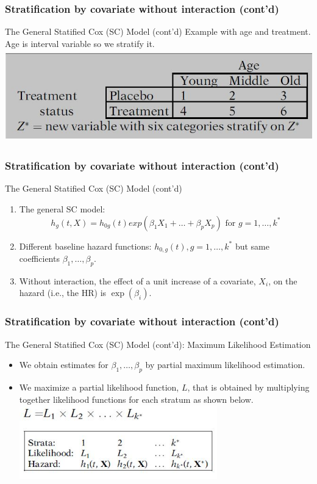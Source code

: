 \documentclass{beamer}
\theoremstyle{definition}
\begin{document}
\begin{frame}
\frametitle{Stratification by covariate without interaction (cont'd)}
\begin{block}{The General Statified Cox (SC) Model (cont'd)}
Example with age and treatment. Age is interval variable so we stratify it.
   \includegraphics[width =\textwidth, height=4cm]{CH5_exampleSC}
\end{block}
\end{frame}

\begin{frame}
\frametitle{Stratification by covariate without interaction (cont'd)}
\begin{block}{The General Statified Cox (SC) Model (cont'd)}
\begin{enumerate}
\item The general SC model:
\begin{equation} \label{SCnoint} 
h_g(t,X) = h_{0g}(t)exp(\beta_1 X_1 + \ldots + \beta_p X_p) \text{ for }  g=1,\ldots,k^*
\end{equation} 
\item Different baseline hazard functions: $h_{0,g}(t), g=1,\ldots,k^*$ but same coefficients $\beta_1, \ldots, \beta_p$.
\item Without interaction, the effect of a unit increase of a covariate, $X_i$, on the hazard (i.e., the HR) is $\exp(\beta_i)$.
\end{enumerate}
\end{block}
\end{frame}

\begin{frame}
\frametitle{Stratification by covariate without interaction (cont'd)}
\begin{block}{The General Statified Cox (SC) Model (cont'd): Maximum Likelihood Estimation}
\begin{itemize}
\item We obtain estimates for $\beta_1,\ldots,\beta_p$ by partial maximum likelihood estimation.
\item We maximize a partial likelihood function, $L$, that is obtained by multiplying together likelihood functions for each
stratum as shown below.
\vspace{10pt}
\includegraphics[width =\textwidth, height=3.2cm]{CH5_Partiallike}
\end{itemize}
\end{block}
\end{frame}
\end{document}
